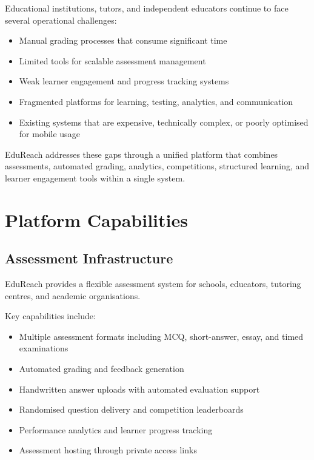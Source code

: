 \documentclass[a4paper,11pt]{article}
\begin{document}
Educational institutions, tutors, and independent educators continue to face several operational challenges:

\begin{itemize}[nosep]
    \item Manual grading processes that consume significant time
    \item Limited tools for scalable assessment management
    \item Weak learner engagement and progress tracking systems
    \item Fragmented platforms for learning, testing, analytics, and communication
    \item Existing systems that are expensive, technically complex, or poorly optimised for mobile usage
\end{itemize}

EduReach addresses these gaps through a unified platform that combines assessments, automated grading, analytics, competitions, structured learning, and learner engagement tools within a single system.

\section{Platform Capabilities}

\subsection{Assessment Infrastructure}

EduReach provides a flexible assessment system for schools, educators, tutoring centres, and academic organisations.

Key capabilities include:

\begin{itemize}[nosep]
    \item Multiple assessment formats including MCQ, short-answer, essay, and timed examinations
    \item Automated grading and feedback generation
    \item Handwritten answer uploads with automated evaluation support
    \item Randomised question delivery and competition leaderboards
    \item Performance analytics and learner progress tracking
    \item Assessment hosting through private access links
\end{itemize}
\end{document}
